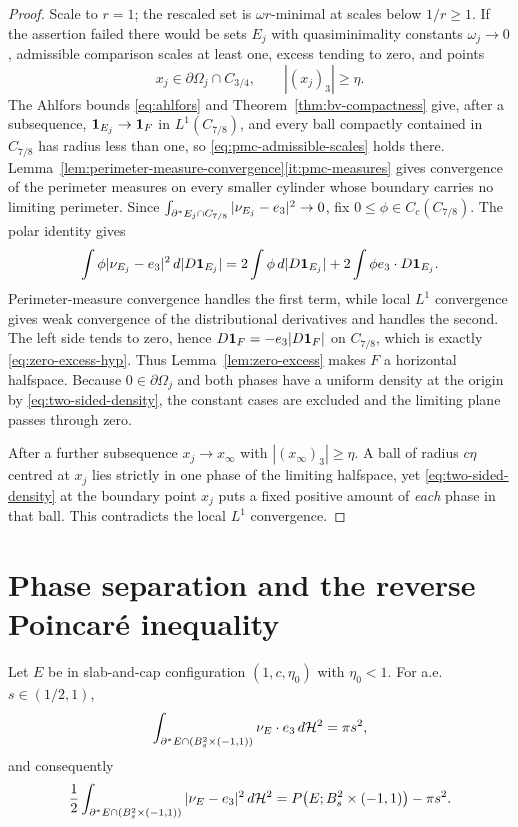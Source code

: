 \begin{proof}
Scale to $r=1$; the rescaled set is $\omega r$-minimal at scales below
$1/r\ge1$.  If the assertion failed there would be sets $E_j$ with
quasiminimality constants $\omega_j\to0$, admissible comparison scales at
least one, excess tending to zero, and points
\[
  x_j\in\partial\Omega_j\cap C_{3/4},\qquad|(x_j)_3|\ge\eta .
\]
The Ahlfors bounds \eqref{eq:ahlfors} and Theorem~\ref{thm:bv-compactness}
give, after a subsequence, $\mathbf 1_{E_j}\to\mathbf 1_{F}$ in $L^1(C_{7/8})$, and
every ball compactly contained in $C_{7/8}$ has radius less than one, so
\eqref{eq:pmc-admissible-scales} holds there.
Lemma~\ref{lem:perimeter-measure-convergence}\ref{it:pmc-measures} gives
convergence of the perimeter measures on every smaller cylinder whose boundary
carries no limiting perimeter.  Since
$\int_{\partial^*{E_j}\cap C_{7/8}}|\nu_{E_j}-e_3|^2\to0$, fix
$0\le\phi\in C_c(C_{7/8})$.  The polar identity gives
\[
 \int\phi|\nu_{E_j}-e_3|^2\,d|D\mathbf 1_{E_j}|
 =2\int\phi\,d|D\mathbf 1_{E_j}|+2\int\phi e_3\cdot D\mathbf 1_{E_j}.
\]
Perimeter-measure convergence handles the first term, while local $L^1$
convergence gives weak convergence of the distributional derivatives and
handles the second.  The left side tends to zero, hence
$D\mathbf 1_{F}=-e_3|D\mathbf 1_{F}|$ on $C_{7/8}$, which is exactly
\eqref{eq:zero-excess-hyp}.  Thus Lemma~\ref{lem:zero-excess} makes $F$ a
horizontal halfspace.  Because $0\in\partial\Omega_j$ and both phases have a
uniform density at the origin by \eqref{eq:two-sided-density}, the constant
cases are excluded and the limiting plane passes through zero.

After a further subsequence $x_j\to x_\infty$ with
$|(x_\infty)_3|\ge\eta$.  A ball of radius $c\eta$ centred at $x_j$ lies
strictly in one phase of the limiting halfspace, yet
\eqref{eq:two-sided-density} at the boundary point $x_j$ puts a fixed positive
amount of \emph{each} phase in that ball.  This contradicts the local $L^1$
convergence.
\end{proof}

\section{Phase separation and the reverse Poincar\'e inequality}

\begin{lemma}\label{lem:flux-defect}
Let $E$ be in slab-and-cap configuration $(1,c,\eta_0)$ with
$\eta_0<1$.  For a.e.\ $s\in(1/2,1)$,
\begin{equation}\label{eq:flux}
  \int_{\partial^* E\cap(B_s^2\times(-1,1))}\nu_E\cdot e_3\,d\mathcal H^2=\pi s^2 ,
\end{equation}
and consequently
\begin{equation}\label{eq:flux-defect}
  \frac12\int_{\partial^* E\cap(B_s^2\times(-1,1))}|\nu_E-e_3|^2\,d\mathcal H^2
  =P\bigl(E;B_s^2\times(-1,1)\bigr)-\pi s^2 .
\end{equation}
\end{lemma}

